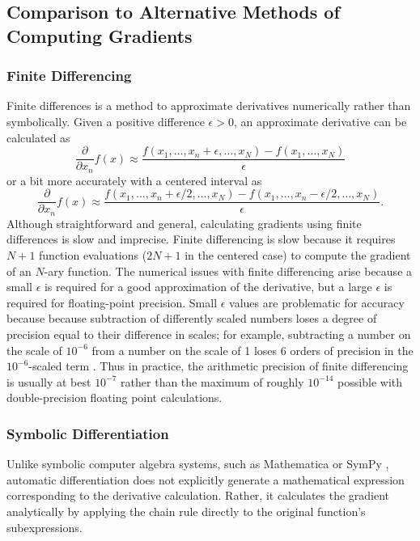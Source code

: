\documentclass[10pt]{article}
\begin{document}
\subsection{Comparison to Alternative Methods of Computing Gradients}

\subsubsection{Finite Differencing}

Finite differences is a method to approximate derivatives numerically
rather than symbolically.  Given a positive difference $\epsilon > 0$,
an approximate derivative can be calculated as
\[
\frac{\partial}{\partial x_n} f(x) 
\approx 
\frac{f(x_1,\ldots,x_n + \epsilon, \ldots, x_N) - f(x_1, \ldots, x_N)}
     {\epsilon}
\]
or a bit more accurately with a centered interval as
\[
\frac{\partial}{\partial x_n} f(x) 
\approx 
\frac{f(x_1,\ldots,x_n + \epsilon/2, \ldots, x_N) 
      - f(x_1,\ldots,x_n - \epsilon/2, \ldots, x_N)}
     {\epsilon}.
\]
%
Although straightforward and general, calculating gradients using
finite differences is slow and imprecise.  Finite differencing is slow
because it requires $N + 1$ function evaluations ($2N + 1$ in the
centered case) to compute the gradient of an $N$-ary function.  The
numerical issues with finite differencing arise because a small
$\epsilon$ is required for a good approximation of the derivative, but
a large $\epsilon$ is required for floating-point precision.  Small
$\epsilon$ values are problematic for accuracy because because
subtraction of differently scaled numbers loses a degree of precision
equal to their difference in scales; for example, subtracting a number
on the scale of $10^{-6}$ from a number on the scale of 1 loses 6
orders of precision in the $10^{-6}$-scaled term \citep{higham:2002}.
Thus in practice, the arithmetic precision of finite differencing is
usually at best $10^{-7}$ rather than the maximum of roughly
$10^{-14}$ possible with double-precision floating point calculations.

\subsubsection{Symbolic Differentiation}

Unlike symbolic computer algebra systems, such as Mathematica
\citep{mathematica:2014} or SymPy \citep{sympy:2014}, automatic
differentiation does not explicitly generate a mathematical expression
corresponding to the derivative calculation.  Rather, it calculates
the gradient analytically by applying the chain rule directly to the
original function's subexpressions.
\end{document}
